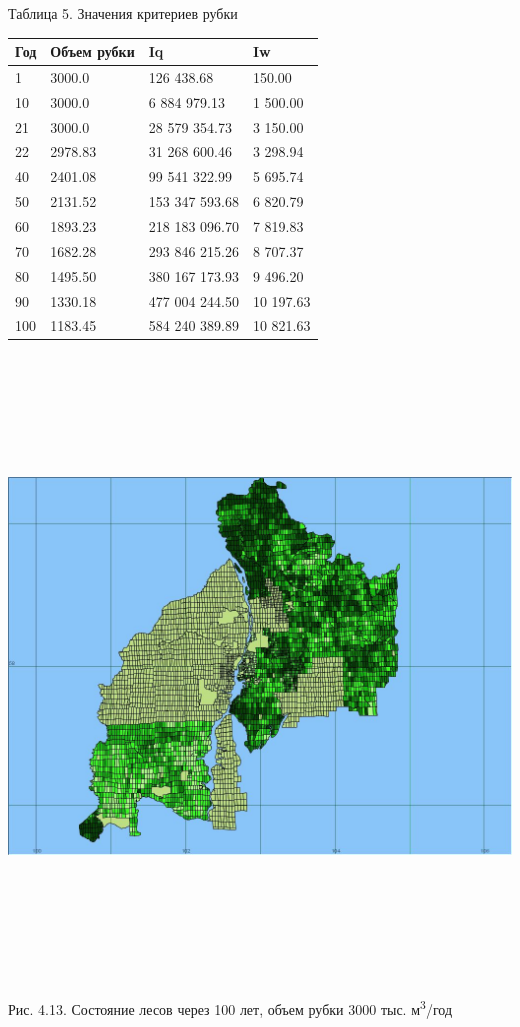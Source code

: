 \documentclass{article}
\begin{document}
\begin{flushright}
Таблица 5. Значения критериев рубки

\begin{tabular}{|>{\raggedright}p{40pt}|>{\raggedright}p{92pt}|>{\raggedright}p{138pt}|>{\raggedright}p{138pt}|}
\hline
Год & Объем рубки & Iq & Iw\tabularnewline
\hline
1 & 3000.0 & 126 438.68 & 150.00\tabularnewline
\hline
10 & 3000.0 & 6 884 979.13 & 1 500.00\tabularnewline
\hline
21 & 3000.0 & 28 579 354.73 & 3 150.00\tabularnewline
\hline
22 & 2978.83 & 31 268 600.46 & 3 298.94\tabularnewline
\hline
40 & 2401.08 & 99 541 322.99 & 5 695.74\tabularnewline
\hline
50 & 2131.52 & 153 347 593.68 & 6 820.79\tabularnewline
\hline
60 & 1893.23 & 218 183 096.70 & 7 819.83\tabularnewline
\hline
70 & 1682.28 & 293 846 215.26 & 8 707.37\tabularnewline
\hline
80 & 1495.50 & 380 167 173.93 & 9 496.20\tabularnewline
\hline
90 & 1330.18 & 477 004 244.50 & 10 197.63\tabularnewline
\hline
100 & 1183.45 & 584 240 389.89 & 10 821.63\tabularnewline
\hline
\end{tabular}
\end{flushright}

\begin{center}
\includegraphics[width=622pt, height=467pt, keepaspectratio=true]{asyaDisser9_3-fig024.png}

Рис. 4.13. Состояние лесов через 100 лет, объем рубки 
3000 тыс. м\textsuperscript{3}/год
\end{center}
\end{document}

